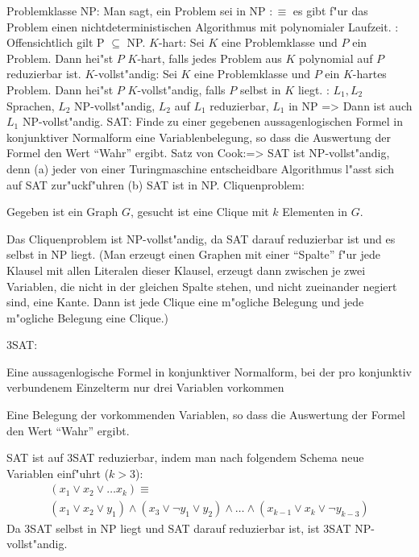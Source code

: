  Problemklasse NP:{
  Man sagt, ein Problem sei in NP $:\equiv$ es gibt f"ur das Problem einen 
  nichtdeterministischen Algorithmus mit polynomialer Laufzeit.
}
\remark:{
  Offensichtlich gilt P $\subseteq$ NP.
}
 $K$-hart:{
  Sei $K$ eine Problemklasse und $P$ ein Problem. Dann hei"st $P$ $K$-hart,
  falls jedes Problem aus $K$ polynomial auf $P$ reduzierbar ist.
}
 $K$-vollst"andig:{
  Sei $K$ eine Problemklasse und $P$ ein $K$-hartes Problem. Dann hei"st 
  $P$ $K$-vollst"andig, falls $P$ selbst in $K$ liegt.
}
\theorem:
  $L_1,L_2$ Sprachen, $L_2$ NP-vollst"andig, $L_2$ auf $L_1$ reduzierbar,
  $L_1$ in NP
  =>
{
  Dann ist auch $L_1$ NP-vollst"andig.
}
\problem SAT:{
  Finde zu einer gegebenen aussagenlogischen Formel in konjunktiver Normalform 
  eine Variablenbelegung, so dass die Auswertung der Formel den Wert ``Wahr''
  ergibt.
}
\theorem Satz von Cook:=>
{
  SAT ist NP-vollst"andig, denn (a) jeder von einer Turingmaschine 
  entscheidbare Algorithmus l"asst sich auf SAT zur"uckf"uhren 
  (b) SAT ist in NP.
}
\problem Cliquenproblem:{
  Gegeben ist ein Graph $G$, gesucht ist eine Clique mit $k$ Elementen in $G$.
  
  Das Cliquenproblem ist NP-vollst"andig, da SAT darauf reduzierbar ist
  und es selbst in NP liegt.
  (Man erzeugt einen Graphen mit einer ``Spalte'' f"ur jede Klausel mit 
  allen Literalen dieser Klausel, erzeugt dann zwischen je zwei Variablen, 
  die nicht in der gleichen Spalte stehen, und nicht zueinander negiert
  sind, eine Kante. Dann ist jede Clique eine m"ogliche Belegung und jede
  m"ogliche Belegung eine Clique.)
}
\problem 3SAT:{
  \given Eine aussagenlogische Formel in konjunktiver Normalform, bei
  der pro konjunktiv verbundenem Einzelterm nur drei Variablen vorkommen
  
  \aim Eine Belegung der vorkommenden Variablen, so dass die Auswertung
  der Formel den Wert ``Wahr'' ergibt.
  
  SAT ist auf 3SAT reduzierbar, indem man nach folgendem Schema
  neue Variablen einf"uhrt ($k>3$):
  \begin{multline*}
    (x_1 \lor x_2 \lor \ldots x_k) \equiv \\
    (x_1 \lor x_2 \lor y_1) \land (x_3\lor \neg y_1 \lor y_2) \land
      \ldots \land (x_{k-1} \lor x_k \lor \neg y_{k-3})
  \end{multline*}
  Da 3SAT selbst in NP liegt und SAT darauf reduzierbar ist, ist 3SAT
  NP-vollst"andig.
}
